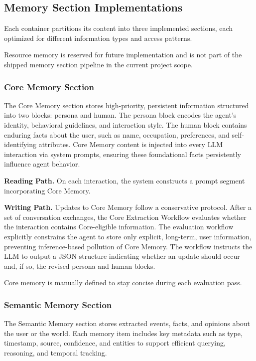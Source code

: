 \documentclass[12pt,a4paper]{article}
\begin{document}
\subsection{Memory Section Implementations}

Each container partitions its content into three implemented sections, each optimized for different information types and access patterns.

Resource memory is reserved for future implementation and is not part of the shipped memory section pipeline in the current project scope.

\subsubsection{Core Memory Section}

The Core Memory section stores high-priority, persistent information structured into two blocks: persona and human. The persona block encodes the agent's identity, behavioral guidelines, and interaction style. The human block contains enduring facts about the user, such as name, occupation, preferences, and self-identifying attributes. Core Memory content is injected into every LLM interaction via system prompts, ensuring these foundational facts persistently influence agent behavior.

\textbf{Reading Path.} On each interaction, the system constructs a prompt segment incorporating Core Memory.

\textbf{Writing Path.} Updates to Core Memory follow a conservative protocol. After a set of conversation exchanges, the Core Extraction Workflow evaluates whether the interaction contains Core-eligible information. The evaluation workflow explicitly constrains the agent to store only explicit, long-term, user information, preventing inference-based pollution of Core Memory. The workflow instructs the LLM to output a JSON structure indicating whether an update should occur and, if so, the revised persona and human blocks.

Core memory is manually defined to stay concise during each evaluation pass.

\subsubsection{Semantic Memory Section}

The Semantic Memory section stores extracted events, facts, and opinions about the user or the world. Each memory item includes key metadata such as type, timestamp, source, confidence, and entities to support efficient querying, reasoning, and temporal tracking.
\end{document}
